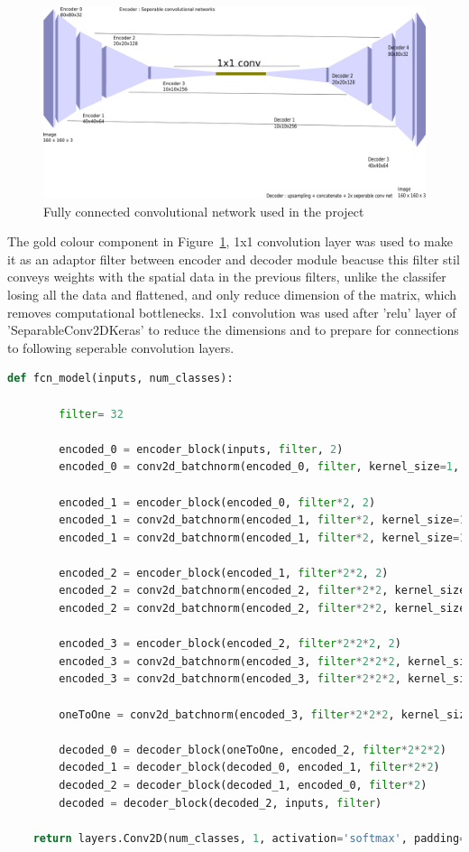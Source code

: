 \documentclass[paper=a4, fontsize=11pt]{scrartcl} %
\numberwithin{equation}{section} %
\numberwithin{figure}{section} %
\numberwithin{table}{section} %
\begin{document}
\begin{figure}[htp]
	\centering
	\includegraphics[scale=0.35]{./imgs/FCN.png}
	\caption{Fully connected convolutional network used in the project}
	\label{fig:FCN}
\end{figure}
The gold colour component in Figure~\ref{fig:FCN}, 1x1 convolution layer was used to make it as an adaptor filter between encoder and decoder module beacuse this filter stil conveys weights with the spatial data in the previous filters, unlike the classifer losing all the data and flattened, and only reduce dimension of the matrix, which removes computational bottlenecks. 1x1 convolution was used after 'relu' layer of 'SeparableConv2DKeras' to reduce the dimensions and to prepare for connections to following seperable convolution layers.

\begin{lstlisting}[language=Python, caption=Fully convolutional network code]
	def fcn_model(inputs, num_classes):

		filter= 32
		
		encoded_0 = encoder_block(inputs, filter, 2)
		encoded_0 = conv2d_batchnorm(encoded_0, filter, kernel_size=1, strides=1)

		encoded_1 = encoder_block(encoded_0, filter*2, 2)
		encoded_1 = conv2d_batchnorm(encoded_1, filter*2, kernel_size=1, strides=1)
		encoded_1 = conv2d_batchnorm(encoded_1, filter*2, kernel_size=1, strides=1)

		encoded_2 = encoder_block(encoded_1, filter*2*2, 2)
		encoded_2 = conv2d_batchnorm(encoded_2, filter*2*2, kernel_size=1, strides=1)
		encoded_2 = conv2d_batchnorm(encoded_2, filter*2*2, kernel_size=1, strides=1)

		encoded_3 = encoder_block(encoded_2, filter*2*2*2, 2)
		encoded_3 = conv2d_batchnorm(encoded_3, filter*2*2*2, kernel_size=1, strides=1)
		encoded_3 = conv2d_batchnorm(encoded_3, filter*2*2*2, kernel_size=1, strides=1)

		oneToOne = conv2d_batchnorm(encoded_3, filter*2*2*2, kernel_size=1, strides=1)
		
		decoded_0 = decoder_block(oneToOne, encoded_2, filter*2*2*2)
		decoded_1 = decoder_block(decoded_0, encoded_1, filter*2*2)
		decoded_2 = decoder_block(decoded_1, encoded_0, filter*2)
		decoded = decoder_block(decoded_2, inputs, filter)
    
    return layers.Conv2D(num_classes, 1, activation='softmax', padding='same')(decoded)
\end{lstlisting}
\end{document}

